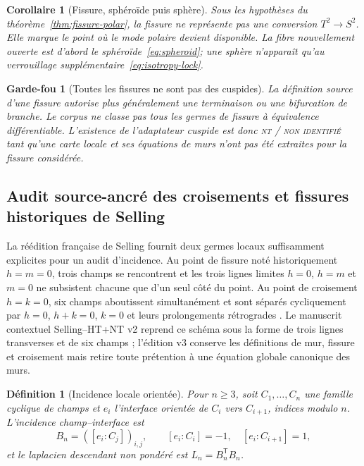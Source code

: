 \documentclass[11pt,a4paper]{article}
\newtheorem{corollary}[theorem]{Corollaire}
\newtheorem{definition}[theorem]{Définition}
\newtheorem{guardrail}[theorem]{Garde-fou}
\newcommand{\statusNT}{\textsc{nt / non identifié}}
\begin{document}
\begin{corollary}[Fissure, sphéroïde puis sphère]
Sous les hypothèses du théorème~\ref{thm:fissure-polar}, la fissure ne représente pas une conversion $T^2\to S^2$. Elle marque le point où le mode polaire devient disponible. La fibre nouvellement ouverte est d'abord le sphéroïde~\eqref{eq:spheroid}; une sphère n'apparaît qu'au verrouillage supplémentaire~\eqref{eq:isotropy-lock}.
\end{corollary}

\begin{guardrail}[Toutes les fissures ne sont pas des cuspides]
La définition source d'une fissure autorise plus généralement une terminaison ou une bifurcation de branche. Le corpus ne classe pas tous les germes de fissure à équivalence différentiable. L'existence de l'adaptateur cuspide est donc \statusNT{} tant qu'une carte locale et ses équations de murs n'ont pas été extraites pour la fissure considérée.
\end{guardrail}

\subsection{Audit source-ancré des croisements et fissures historiques de Selling}\label{subsec:selling-local-audit}

La réédition française de Selling fournit deux germes locaux suffisamment explicites pour un audit d'incidence. Au point de fissure noté historiquement $h=m=0$, trois champs se rencontrent et les trois lignes limites $h=0$, $h=m$ et $m=0$ ne subsistent chacune que d'un seul côté du point. Au point de croisement $h=k=0$, six champs aboutissent simultanément et sont séparés cycliquement par $h=0$, $h+k=0$, $k=0$ et leurs prolongements rétrogrades \cite{Selling1877}. Le manuscrit contextuel Selling--HT+NT v2 reprend ce schéma sous la forme de trois lignes transverses et de six champs ; l'édition v3 conserve les définitions de mur, fissure et croisement mais retire toute prétention à une équation globale canonique des murs.

\begin{definition}[Incidence locale orientée]\label{def:local-incidence}
Pour $n\ge3$, soit $C_1,\ldots,C_n$ une famille cyclique de champs et $e_i$ l'interface orientée de $C_i$ vers $C_{i+1}$, indices modulo $n$. L'incidence champ--interface est
\[
 B_n=( [e_i:C_j])_{i,j},\qquad
 [e_i:C_i]=-1,\quad [e_i:C_{i+1}]=1,
\]
et le laplacien descendant non pondéré est $L_n=B_n^{\mathsf T}B_n$.
\end{definition}
\end{document}
